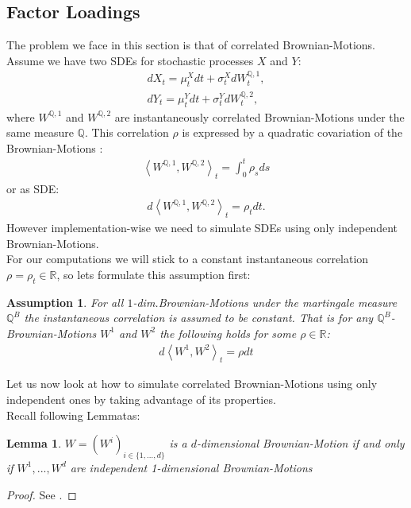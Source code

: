 \documentclass[12pt]{article}
\newtheorem{assumption}{Assumption}[section]
\newtheorem{lemma}[theorem]{Lemma}
\begin{document}
	\subsection{Factor Loadings}\label{sec::FactorLoading}
	The problem we face in this section is that of correlated Brownian-Motions. \\
	Assume we have two SDEs for stochastic processes $X$ and $Y$:	
	\begin{align*}
		dX_t = \mu^X_t dt + \sigma^X_t dW^{\mathbb{Q}, 1}_t,\\
		dY_t = \mu^Y_t dt + \sigma^Y_t dW^{\mathbb{Q}, 2}_t,
	\end{align*}
	where $W^{\mathbb{Q}, 1}$ and $W^{\mathbb{Q}, 2}$ are instantaneously correlated Brownian-Motions under the same measure $\mathbb{Q}$. This correlation $\rho$ is expressed by a quadratic covariation of the Brownian-Motions \cite{FriesBook}:
	\begin{align*}
		\left\langle W^{\mathbb{Q}, 1}, W^{\mathbb{Q}, 2} \right\rangle_t = \int_{0}^{t}\rho_s ds
	\end{align*}
	or as SDE:
	\begin{align*}
		d\left\langle W^{\mathbb{Q}, 1}, W^{\mathbb{Q}, 2} \right\rangle_t = \rho_t dt.
	\end{align*}
	However implementation-wise we need to simulate SDEs using only independent Brownian-Motions.\\
	For our computations we will stick to a constant instantaneous correlation $\rho = \rho_t \in \mathbb{R}$, so lets formulate this assumption first:
	\begin{assumption}
		For all $1$-dim.Brownian-Motions under the martingale measure $\mathbb{Q}^B$ the instantaneous correlation is assumed to be constant. That is for any $\mathbb{Q}^B$-Brownian-Motions $W^1$ and $W^2$ the following holds for some $\rho \in \mathbb{R}$:
		\begin{align*}
			d\left\langle W^{1}, W^{2} \right\rangle_t = \rho dt
		\end{align*}
	\end{assumption}
	Let us now look at how to simulate correlated Brownian-Motions using only independent ones by taking advantage of its properties.\\
	Recall following Lemmatas:
	\begin{lemma}
		$W = (W^i)_{i\in\{1, ..., d\}}$ is a $d$-dimensional Brownian-Motion if and only if $W^1, ..., W^d$ are independent 1-dimensional Brownian-Motions
	\end{lemma}
	\begin{proof}
		See \cite{fima2Lecture}.
	\end{proof}
\end{document}
